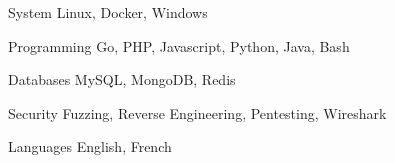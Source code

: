 

\begin{cvskills}

  \cvskill
    {System} %
    {Linux, Docker, Windows} %

  \cvskill
    {Programming} %
    {Go, PHP, Javascript, Python, Java, Bash} %

  \cvskill
    {Databases} %
    {MySQL, MongoDB, Redis} %

  \cvskill
    {Security} %
    {Fuzzing, Reverse Engineering, Pentesting, Wireshark} %

  \cvskill
    {Languages} %
    {English, French} %

\end{cvskills}
